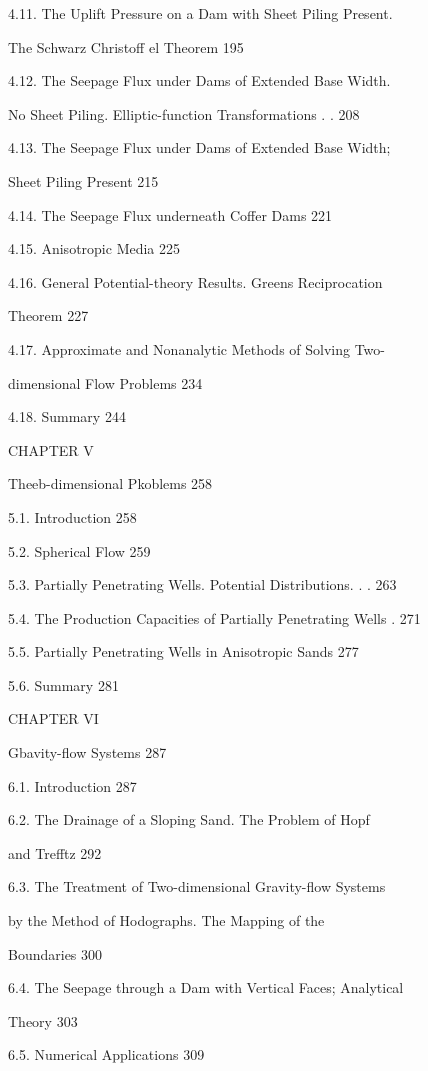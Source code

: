 \documentclass[
  11pt,
]{article}
\begin{document}
4.11. The Uplift Pressure on a Dam with Sheet Piling Present. \par
The Schwarz Christoff el Theorem 195 \par
4.12. The Seepage Flux under Dams of Extended Base Width. \par
No Sheet Piling. Elliptic-function Transformations . . 208 \par
4.13. The Seepage Flux under Dams of Extended Base Width; \par
Sheet Piling Present 215 \par
4.14. The Seepage Flux underneath Coffer Dams 221 \par
4.15. Anisotropic Media 225 \par
4.16. General Potential-theory Results. Green\textquotesingle s Reciprocation \par
Theorem 227 \par
4.17. Approximate and Nonanalytic Methods of Solving Two- \par
dimensional Flow Problems 234 \par
4.18. Summary 244 \par
CHAPTER V \par
Theeb-dimensional Pkoblems 258 \par
5.1. Introduction 258 \par
5.2. Spherical Flow 259 \par
5.3. Partially Penetrating Wells. Potential Distributions. . . 263 \par
5.4. The Production Capacities of Partially Penetrating Wells . 271 \par
5.5. Partially Penetrating Wells in Anisotropic Sands 277 \par
5.6. Summary 281 \par
CHAPTER VI \par
Gbavity-flow Systems 287 \par
6.1. Introduction 287 \par
6.2. The Drainage of a Sloping Sand. The Problem of Hopf \par
and Trefftz 292 \par
6.3. The Treatment of Two-dimensional Gravity-flow Systems \par
by the Method of Hodographs. The Mapping of the \par
Boundaries 300 \par
6.4. The Seepage through a Dam with Vertical Faces; Analytical \par
Theory 303 \par
6.5. Numerical Applications 309 \par
\end{document}
